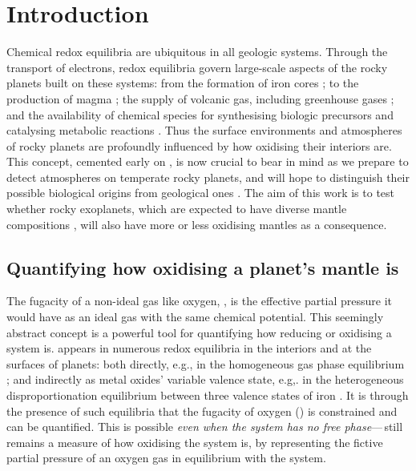 \section{Introduction}

Chemical redox equilibria are ubiquitous in all geologic systems. Through the transport of electrons, redox equilibria govern large-scale aspects of the rocky planets built on these systems: from the formation of iron cores \citep{Wood2006, elkins-tanton_coreless_2008, rubie_accretion_2015, lichtenberg_redox_2021}; to the production of magma \citep[e.g.,][]{holloway_highpressure_1992, foley_reappraisal_2011, stagno_oxidation_2013, lin_oxygen_2021}; the supply of volcanic gas, including greenhouse gases \citep[e.g.,][]{kasting_mantle_1993, Delano2001, gaillard_theoretical_2014, ortenzi_mantle_2020, guimond_low_2021,liggins_growth_2022}; and the availability of chemical species for synthesising biologic precursors and catalysing metabolic reactions \citep[e.g.,][]{muchowska_synthesis_2019, wade_temporal_2021}. Thus the surface environments and atmospheres of rocky planets are profoundly influenced by how oxidising their interiors are. This concept, cemented early on \citep{kasting_mantle_1993, HOLLAND2002, kasting_evolution_2003}, is now crucial to bear in mind as we prepare to detect atmospheres on temperate rocky planets, and will hope to distinguish their possible biological origins from geological ones \citep{wordsworth_redox_2018, wogan_abundant_2020, krissansen-totton_oxygen_2021, krissansen-totton_understanding_2022}. The aim of this work is to test whether rocky exoplanets, which are expected to have diverse mantle compositions \citep{hinkel_star_2018, putirka_composition_2019, spaargaren_plausible_2022, guimond_mantle_2023}, will also have more or less oxidising mantles as a consequence. 


\subsection{Quantifying how oxidising a planet's mantle is}\label{sec:quantifying-how-oxidising}

The fugacity of a non-ideal gas like oxygen, , is the effective partial pressure it would have as an ideal gas with the same chemical potential. This seemingly abstract concept is a powerful tool for quantifying how reducing or oxidising a system is.  appears in numerous redox equilibria in the interiors and at the surfaces of planets: both directly, e.g., in the homogeneous gas phase equilibrium ; and indirectly as metal oxides' variable valence state, e.g,. in the heterogeneous disproportionation equilibrium  between three valence states of iron \citep{frost_redox_2008}.  It is through the presence of such equilibria that the fugacity of oxygen (\fo) is constrained and can be quantified. This is possible \emph{even when the system has no free  phase}---\fo\,still remains a measure of how oxidising the system is, by representing the fictive partial pressure of an oxygen gas in equilibrium with the system. 

